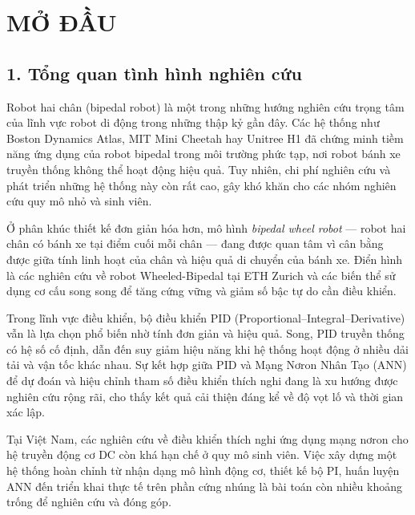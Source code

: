
\chapter{MỞ ĐẦU}
\label{chap:modau}


\section*{1. Tổng quan tình hình nghiên cứu}

Robot hai chân (bipedal robot) là một trong những hướng nghiên cứu trọng tâm của
lĩnh vực robot di động trong những thập kỷ gần đây. Các hệ thống như Boston Dynamics
Atlas, MIT Mini Cheetah hay Unitree H1 đã chứng minh tiềm năng ứng dụng của robot
bipedal trong môi trường phức tạp, nơi robot bánh xe truyền thống không thể hoạt động
hiệu quả. Tuy nhiên, chi phí nghiên cứu và phát triển những hệ thống này còn rất cao,
gây khó khăn cho các nhóm nghiên cứu quy mô nhỏ và sinh viên.

Ở phân khúc thiết kế đơn giản hóa hơn, mô hình \textit{bipedal wheel robot} —
robot hai chân có bánh xe tại điểm cuối mỗi chân — đang được quan tâm vì cân bằng
được giữa tính linh hoạt của chân và hiệu quả di chuyển của bánh xe. Điển hình là các
nghiên cứu về robot Wheeled-Bipedal tại ETH Zurich và các biến thể sử dụng cơ cấu
song song để tăng cứng vững và giảm số bậc tự do cần điều khiển.

Trong lĩnh vực điều khiển, bộ điều khiển PID (Proportional–Integral–Derivative)
vẫn là lựa chọn phổ biến nhờ tính đơn giản và hiệu quả. Song, PID truyền thống có hệ
số cố định, dẫn đến suy giảm hiệu năng khi hệ thống hoạt động ở nhiều dải tải và vận
tốc khác nhau. Sự kết hợp giữa PID và Mạng Nơron Nhân Tạo (ANN) để dự đoán và
hiệu chỉnh tham số điều khiển thích nghi đang là xu hướng được nghiên cứu rộng rãi,
cho thấy kết quả cải thiện đáng kể về độ vọt lố và thời gian xác lập.

Tại Việt Nam, các nghiên cứu về điều khiển thích nghi ứng dụng mạng nơron cho
hệ truyền động cơ DC còn khá hạn chế ở quy mô sinh viên. Việc xây dựng một hệ
thống hoàn chỉnh từ nhận dạng mô hình động cơ, thiết kế bộ PI, huấn luyện ANN đến
triển khai thực tế trên phần cứng nhúng là bài toán còn nhiều khoảng trống để nghiên cứu
và đóng góp.


